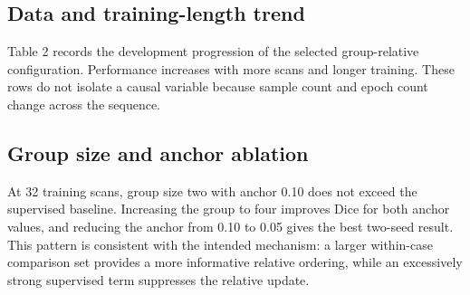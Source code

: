 \documentclass[10pt]{article}
\begin{document}
\subsection{Data and training-length trend}
Table 2 records the development progression of the selected group-relative configuration. Performance increases with more scans and longer training. These rows do not isolate a causal variable because sample count and epoch count change across the sequence.

\begin{table}[t]
\centering
\small
\caption{Table 2. GRPO-style RC development progression; values are two-seed reload-audit means.}
\end{table}
\subsection{Group size and anchor ablation}
At 32 training scans, group size two with anchor 0.10 does not exceed the supervised baseline. Increasing the group to four improves Dice for both anchor values, and reducing the anchor from 0.10 to 0.05 gives the best two-seed result. This pattern is consistent with the intended mechanism: a larger within-case comparison set provides a more informative relative ordering, while an excessively strong supervised term suppresses the relative update.

\begin{table}[t]
\centering
\small
\caption{Table 3. Two-seed RC ablation at 32 training scans and 5 epochs.}
\end{table}
\end{document}
